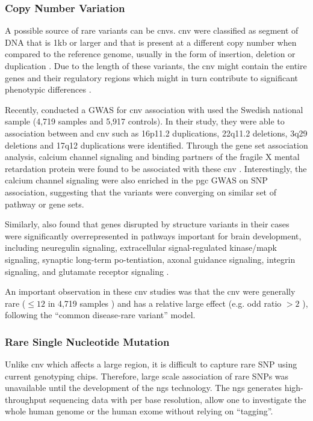 	\subsubsection{Copy Number Variation}
	A possible source of rare variants can be \glspl{cnv}.
	\gls{cnv} were classified as segment of DNA that is 1kb or larger and that is present at a different copy number when compared to the reference genome, usually in the form of insertion, deletion or duplication \citep{Feuk2006}.
	Due to the length of these variants, the \gls{cnv} might contain the entire genes and their regulatory regions which might in turn contribute to significant phenotypic differences \citep{Feuk2006}.
	
	Recently, \citet{Szatkiewicz2014} conducted a \gls{GWAS} for \gls{cnv} association with  used the Swedish national sample (4,719  samples and 5,917 controls).
	In their study, they were able to association between  and \gls{cnv} such as 16p11.2 duplications, 22q11.2 deletions, 3q29 deletions and 17q12 duplications were identified.
	Through the gene set association analysis, calcium channel signaling and binding partners of the fragile X mental retardation protein were found to be associated with these \gls{cnv} \citep{Szatkiewicz2014}.
	Interestingly, the calcium channel signaling were also enriched in the \gls{pgc} \gls{GWAS} on \gls{SNP} association, suggesting that the variants were converging on similar set of pathway or gene sets. 
	
	Similarly, \citet{Walsh2008} also found that genes disrupted by structure variants in their cases were significantly overrepresented in pathways important for brain development, including neuregulin signaling, extracellular signal-regulated kinase/\gls{mapk} signaling, 
	synaptic long-term po-tentiation, axonal guidance signaling, integrin signaling, and glutamate receptor signaling \citep{Walsh2008}.
	
	An important observation in these \gls{cnv} studies was that the \gls{cnv}  were generally rare ($\le12$ in 4,719 samples \citep{Szatkiewicz2014}) and has a relative large effect (e.g. odd ratio $>2$ \citep{Szatkiewicz2014,Walsh2008}), following the ``common disease-rare variant'' model.
	
	\subsubsection{Rare Single Nucleotide Mutation}
	Unlike \gls{cnv} which affects a large region, it is difficult to capture rare \gls{SNP} using current genotyping chips.
	Therefore, large scale association of rare \glspl{SNP} was unavailable until the development of the \gls{ngs} technology.
	The \gls{ngs} generates high-throughput sequencing data with per base resolution, allow one to investigate the whole human genome or the human exome without relying on ``tagging''.
	
